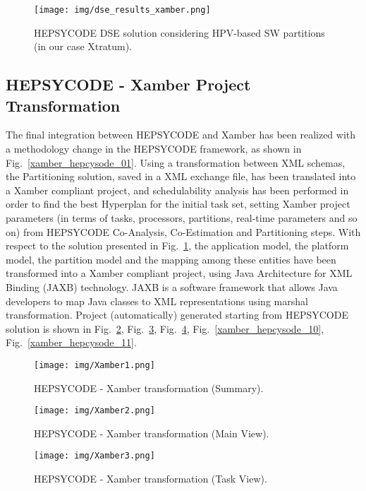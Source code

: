 % 
%
\begin{figure}[htbp]
	\centerline{\texttt{[image: img/dse\_results\_xamber.png]}}
	\caption{HEPSYCODE DSE solution considering HPV-based SW partitions (in our case Xtratum).}
	\label{xamber_hepcysode_06}
\end{figure}
%
\subsection{HEPSYCODE - Xamber Project Transformation}
%
The final integration between HEPSYCODE and Xamber has been realized with a methodology change in the HEPSYCODE framework, as shown in Fig.~\ref{xamber_hepcysode_01}. Using a transformation between XML schemas, the Partitioning solution, saved in a XML exchange file, has been translated into a Xamber compliant project, and schedulability analysis has been performed in order to find the best Hyperplan for the initial task set, setting Xamber project parameters (in terms of tasks, processors, partitions, real-time parameters and so on) from HEPSYCODE Co-Analysis, Co-Estimation and Partitioning steps. With respect to the solution presented in Fig.~\ref{xamber_hepcysode_06}, the application model, the platform model, the partition model and the mapping among these entities have been transformed into a Xamber compliant project, using Java Architecture for XML Binding (JAXB) technology. JAXB is a software framework that allows Java developers to map Java classes to XML representations using marshal transformation. Project (automatically) generated starting from HEPSYCODE solution is shown in Fig.~\ref{xamber_hepcysode_07}, Fig.~\ref{xamber_hepcysode_08}, Fig.~\ref{xamber_hepcysode_09}, Fig.~\ref{xamber_hepcysode_10}, Fig.~\ref{xamber_hepcysode_11}.
%
\begin{landscape}
\begin{figure}[htbp]
	\centerline{\texttt{[image: img/Xamber1.png]}}
	\caption{HEPSYCODE - Xamber transformation (Summary).}
	\label{xamber_hepcysode_07}
\end{figure}
\end{landscape}
%
%
\begin{landscape}
\begin{figure}[htbp]
	\centerline{\texttt{[image: img/Xamber2.png]}}
	\caption{HEPSYCODE - Xamber transformation (Main View).}
	\label{xamber_hepcysode_08}
\end{figure}
\end{landscape}
%
%
\begin{landscape}
\begin{figure}[htbp]
	\centerline{\texttt{[image: img/Xamber3.png]}}
	\caption{HEPSYCODE - Xamber transformation (Task View).}
	\label{xamber_hepcysode_09}
\end{figure}
\end{landscape}
